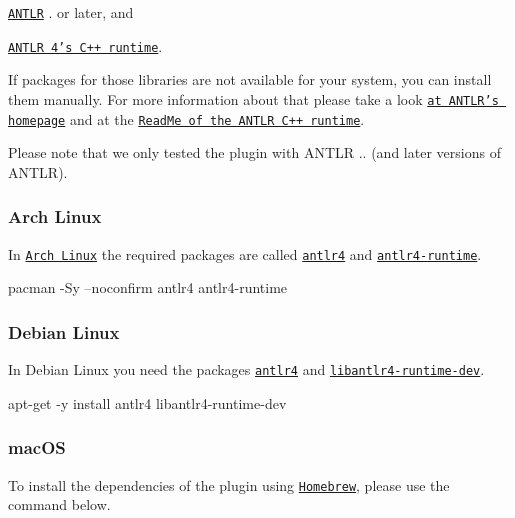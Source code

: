 \begin{DoxyItemize}
\item \href{https://www.antlr.org}{\tt A\+N\+T\+LR} {.} or later, and
\item \href{https://github.com/antlr/antlr4/tree/master/runtime/Cpp}{\tt A\+N\+T\+LR 4’s C++ runtime}.
\end{DoxyItemize}

If packages for those libraries are not available for your system, you can install them manually. For more information about that please take a look \href{https://www.antlr.org}{\tt at A\+N\+T\+L\+R’s homepage} and at the \href{https://github.com/antlr/antlr4/tree/master/runtime/Cpp}{\tt Read\+Me of the A\+N\+T\+LR C++ runtime}.

Please note that we only tested the plugin with A\+N\+T\+LR {..} (and later versions of A\+N\+T\+LR).\hypertarget{autotoc_md955_autotoc_md958}{}\subsubsection{Arch Linux}\label{autotoc_md955_autotoc_md958}
In \href{https://www.archlinux.org}{\tt Arch Linux} the required packages are called \href{https://www.archlinux.org/packages/extra/any/antlr4}{\tt {\ttfamily antlr4}} and \href{https://www.archlinux.org/packages/community/x86_64/antlr4-runtime}{\tt {\ttfamily antlr4-\/runtime}}.


\begin{DoxyCode}
pacman -Sy --noconfirm antlr4 antlr4-runtime
\end{DoxyCode}
\hypertarget{autotoc_md955_autotoc_md959}{}\subsubsection{Debian Linux}\label{autotoc_md955_autotoc_md959}
In Debian Linux you need the packages \href{https://packages.debian.org/sid/antlr4}{\tt {\ttfamily antlr4}} and \href{https://packages.debian.org/sid/libantlr4-runtime-dev}{\tt {\ttfamily libantlr4-\/runtime-\/dev}}.


\begin{DoxyCode}
apt-get -y install antlr4 libantlr4-runtime-dev
\end{DoxyCode}
\hypertarget{autotoc_md955_autotoc_md960}{}\subsubsection{mac\+OS}\label{autotoc_md955_autotoc_md960}
To install the dependencies of the plugin using \href{https://brew.sh}{\tt Homebrew}, please use the command below.


